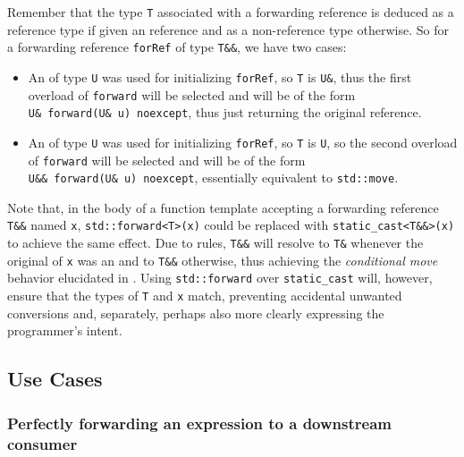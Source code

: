 Remember that the type \lstinline!T! associated with a forwarding reference
is deduced as a reference type if given an  reference and
as a non-reference type otherwise. So for a forwarding reference
\lstinline!forRef! of type \lstinline!T&&!, we have two cases:
\begin{itemize}
\item{An  of type \lstinline!U! was used for initializing \lstinline!forRef!, so \lstinline!T! is \lstinline!U&!, thus the first overload of \lstinline!forward! will be selected and will be of the form \lstinline!U&!~\lstinline!forward(U&!~\lstinline!u)!~\lstinline!noexcept!, thus just returning the original  reference.}
\item{An  of type \lstinline!U! was used for initializing \lstinline!forRef!, so \lstinline!T! is \lstinline!U!, so the second overload of \lstinline!forward! will be selected and will be of the form \lstinline!U&&!~\lstinline!forward(U&!~\lstinline!u)!~\lstinline!noexcept!, essentially equivalent to \lstinline!std::move!.}
\end{itemize}
Note that, in the body of a function template accepting a forwarding
reference \lstinline!T&&! named \lstinline!x!, \lstinline!std::forward<T>(x)!
could be replaced with \lstinline!static_cast<T&&>(x)! to achieve the
same effect. Due to  rules, \lstinline!T&&!
will resolve to \lstinline!T&! whenever the original  of \lstinline!x! was an  and to \lstinline!T&&!
otherwise, thus achieving the \emph{conditional move} behavior
elucidated in .
Using \lstinline!std::forward! over \lstinline!static_cast!
will, however, ensure that the types of \lstinline!T! and \lstinline!x! match,
preventing accidental unwanted conversions and, separately, perhaps also
more clearly expressing the programmer's intent.

\subsection[Use Cases]{Use Cases}\label{use-cases-forwardingref}

\subsubsection[Perfectly forwarding an expression to a downstream consumer]{Perfectly forwarding an expression to a downstream consumer}\label{perfectly-forwarding-an-expression-to-a-downstream-consumer}

